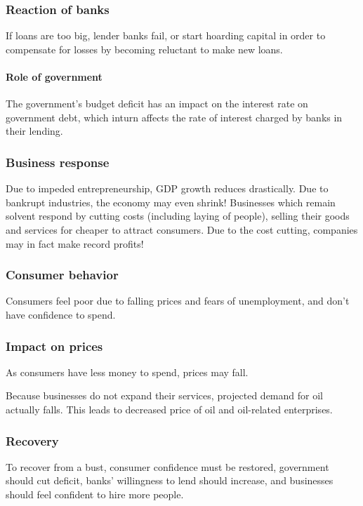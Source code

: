 \documentclass[oneside, article]{memoir}
\begin{document}
\subsubsection{Reaction of banks}
If loans are too big, lender banks fail, or start hoarding capital in order to compensate for losses by becoming reluctant to make new loans.

\paragraph{Role of government}
The government's budget deficit has an impact on the interest rate on government debt, which inturn affects the rate of interest charged by banks in their lending.

\subsubsection{Business response}
Due to impeded entrepreneurship, GDP growth reduces drastically. Due to bankrupt industries, the economy may even shrink! Businesses which remain solvent respond by cutting costs (including laying of people), selling their goods and services for cheaper to attract consumers. Due to the cost cutting, companies may in fact make record profits!

\subsubsection{Consumer behavior}
Consumers feel poor due to falling prices and fears of unemployment, and don't have confidence to spend.

\subsubsection{Impact on prices}
As consumers have less money to spend, prices may fall.

Because businesses do not expand their services, projected demand for oil actually falls. This leads to decreased price of oil and oil-related enterprises.

\subsubsection{Recovery}
To recover from a bust, consumer confidence must be restored, government should cut deficit, banks' willingness to lend should increase, and businesses should feel confident to hire more people.
\end{document}
